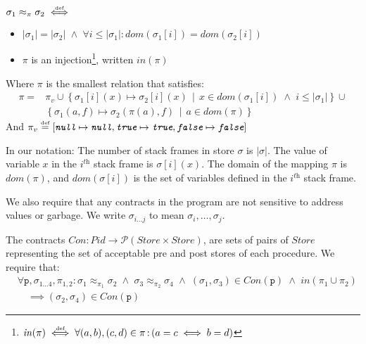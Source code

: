 \documentclass[runningheads,a4paper]{llncs}
\DeclareMathOperator{\band}{\bm{\;\land\;}}
\DeclareMathOperator{\suchthat}{:}
\newcommand*{\qvars}[2]{#1_{#2}}
\newcommand*{\powerset}[1]{\mathcal{P}(#1)}
\newcommand*{\domain}[1]{\mathit{dom}(#1)}
\newcommand*{\cardinality}[1]{\left|{#1}\right|}
\newcommand*{\defeq}{\stackrel{\text{\tiny def}}{=}}
\newcommand*{\defiff}{\stackrel{\text{\tiny def}}{\iff}}
\newcommand*{\setcomp}[2]{\left\{#1\,\middle|\,#2\right\}}
\newcommand*{\Store}{\mathit{Store}}
\newcommand*{\nullv}{\texttt{null}}
\newcommand*{\truev}{\texttt{true}}
\newcommand*{\falsev}{\texttt{false}}
\newcommand*{\Contract}{\mathit{Con}}
\newcommand*\iso{\approx}
\newcommand*{\PName}{\mathit{Pid}}
\newcommand*{\fun}{\texttt{p}}
\newcommand*{\bijection}[1]{\mathit{in}{\left(#1\right)}}
\newcommand*{\store}{\sigma}
\begin{document}
\newcommand*{\piv}{\pi_v}
\begin{definition}[Isomorphism]\label{def:global isomorphism}\setlength{\parindent}{0cm}~

	$\store_1\iso_\pi\store_2 \defiff$
	\begin{itemize}
		\item $\cardinality{\store_1} = \cardinality{\store_2} \band \forall i \le \cardinality{\store_1} \suchthat\domain{\store_1[i]} = \domain{\store_2[i]}$
		\item $\pi$ is an injection\footnote{$\bijection{\pi} \defiff \forall (a,b), (c,d) \in \pi \suchthat \left(a=c \iff b=d\right)$}, written $\bijection{\pi}$
	\end{itemize}

	Where $\pi$ is the smallest relation that satisfies:
		\[\begin{aligned}
		   \pi = &\piv \cup
		   \setcomp{\store_1[i](x)\mapsto\store_2[i](x)}{x \in \domain{\store_1[i]} \band i \le \cardinality{\store_1}} \cup \\
		   &\setcomp{\store_1(a,f)\mapsto\store_2(\pi(a),f)}{a \in \domain{\pi}}
		\end{aligned}\]
	And $\piv \defeq [\mathrm{\emph{\nullv}}\mapsto\mathrm{\emph{\nullv}}, \mathrm{\emph{\truev}}\mapsto\mathrm{\emph{\truev}}, \mathrm{\emph{\falsev}}\mapsto\mathrm{\emph{\falsev}}]$
\end{definition}

In our notation: The number of stack frames in store $\store$ is $\cardinality{\store}$. The value of variable $x$ in the $i^{\textit{th}}$ stack frame is $\store[i](x)$. The domain of the mapping $\pi$ is $\domain{\pi}$, and $\domain{\store[i]}$ is the set of variables defined in the $i^{\textit{th}}$ stack frame.

We also require that any contracts in the program are not sensitive to address values or garbage. We write $\qvars{\store}{i \ldots j}$ to mean $\store_i,\ldots,\store_j$.
\begin{definition}\label{def:contracts}
The contracts $\Contract: \PName \rightarrow \powerset{\Store \times \Store}$, are sets of pairs of $\Store$ representing the set of acceptable pre and post stores of each procedure. We require that:
\[\begin{aligned}
	&	\forall \fun,\qvars{\store}{1 \ldots 4},\qvars{\pi}{1,2} \suchthat
		\store_1 \iso_{\pi_1} \store_2 \band \store_3 \iso_{\pi_2} \store_4 \band (\store_1,\store_3) \in \Contract(\fun) \band \bijection{\pi_1 \cup \pi_2}  \\
	&\quad	\implies
		(\store_2,\store_4) \in \Contract(\fun)
\end{aligned}\]
\end{definition}
\end{document}
